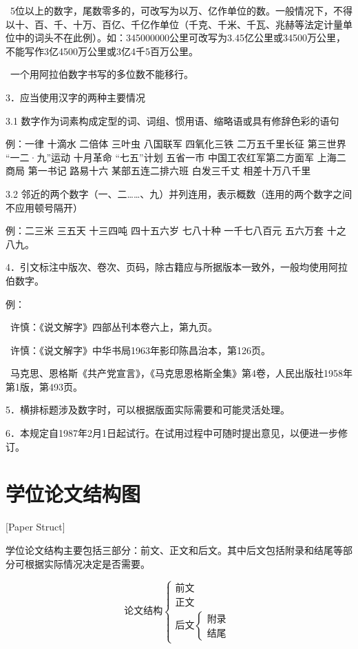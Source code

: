 ~5位以上的数字，尾数零多的，可改写为以万、亿作单位的数。一般情况下，不得以十、百、千、十万、百亿、千亿作单位（千克、千米、千瓦、兆赫等法定计量单位中的词头不在此例）。如：345000000公里可改写为3.45亿公里或34500万公里，不能写作3亿4500万公里或3亿4千5百万公里。

~一个用阿拉伯数字书写的多位数不能移行。

3．应当使用汉字的两种主要情况

3.1  数字作为词素构成定型的词、词组、惯用语、缩略语或具有修辞色彩的语句

例：一律  十滴水  二倍体  三叶虫  八国联军  四氧化三铁  二万五千里长征  第三世界  “一二·九”运动  十月革命  “七五”计划  五省一市  中国工农红军第二方面军  上海二商局 第一书记  路易十六  某部五连二排六班  白发三千丈  相差十万八千里

3.2  邻近的两个数字（一、二……、九）并列连用，表示概数（连用的两个数字之间不应用顿号隔开）

例：二三米  三五天  十三四吨  四十五六岁  七八十种  一千七八百元  五六万套  十之八九。

4．引文标注中版次、卷次、页码，除古籍应与所据版本一致外，一般均使用阿拉伯数字。

例：

~许慎：《说文解字》四部丛刊本卷六上，第九页。

~许慎：《说文解字》中华书局1963年影印陈昌治本，第126页。

~马克思、恩格斯《共产党宣言》，《马克思恩格斯全集》第4卷，人民出版社1958年第1版，第493页。

5．横排标题涉及数字时，可以根据版面实际需要和可能灵活处理。

6．本规定自1987年2月1日起试行。在试用过程中可随时提出意见，以便进一步修订。

\chapter{学位论文结构图}[Paper Struct]

学位论文结构主要包括三部分：前文、正文和后文。其中后文包括附录和结尾等部分可根据实际情况决定是否需要。

\[
  \text{论文结构}
  \begin{cases}
    \text{前文} \\
    \text{正文} \\
    \text{后文}
    \begin{cases}
      \text{附录} \\
      \text{结尾}
    \end{cases}
  \end{cases}
\]

